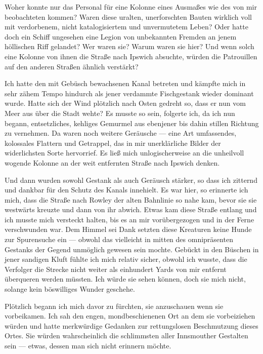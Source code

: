 Woher konnte nur das Personal für eine Kolonne eines Ausmaßes wie des von mir beobachteten kommen? Waren diese uralten, unerforschten Bauten wirklich voll mit verdorbenem, nicht katalogisiertem und unvermutetem Leben? Oder hatte doch ein Schiff ungesehen eine Legion von unbekannten Fremden an jenem höllischen Riff gelandet? Wer waren sie? Warum waren sie hier? Und wenn solch eine Kolonne von ihnen die Straße nach Ipswich absuchte, würden die Patrouillen auf den anderen Straßen ähnlich verstärkt?

Ich hatte den mit Gebüsch bewachsenen Kanal betreten und kämpfte mich in sehr zähem Tempo hindurch als jener verdammte Fischgestank wieder dominant wurde. Hatte sich der Wind plötzlich nach Osten gedreht so, dass er nun vom Meer aus über die Stadt wehte? Es musste so sein, folgerte ich, da ich nun begann, entsetzliches, kehliges Gemurmel aus ebenjener bis dahin stillen Richtung zu vernehmen. Da waren noch weitere Geräusche --- eine Art umfassendes, kolossales Flattern und Getrappel, das in mir unerklärliche Bilder der widerlichsten Sorte hervorrief. Es ließ mich unlogischerweise an die unheilvoll wogende Kolonne an der weit entfernten Straße nach Ipswich denken.

Und dann wurden sowohl Gestank als auch Geräusch stärker, so dass ich zitternd und dankbar für den Schutz des Kanals innehielt. Es war hier, so erinnerte ich mich, dass die Straße nach Rowley der alten Bahnlinie so nahe kam, bevor sie sie westwärts kreuzte und dann von ihr abwich. Etwas kam diese Straße entlang und ich musste mich versteckt halten, bis es an mir vorübergezogen und in der Ferne verschwunden war. Dem Himmel sei Dank setzten diese Kreaturen keine Hunde zur Spurensuche ein --- obwohl das vielleicht in mitten des omnipräsenten Gestanks der Gegend unmöglich gewesen sein mochte. Gebückt in den Büschen in jener sandigen Kluft fühlte ich mich relativ sicher, obwohl ich wusste, dass die Verfolger die Strecke nicht weiter als einhundert Yards von mir entfernt überqueren werden müssten. Ich würde sie sehen können, doch sie mich nicht, solange kein böswilliges Wunder geschehe.

Plötzlich begann ich mich davor zu fürchten, sie anzuschauen wenn sie vorbeikamen. Ich sah den engen, mondbeschienenen Ort an dem sie vorbeiziehen würden und hatte merkwürdige Gedanken zur rettungslosen Beschmutzung dieses Ortes. Sie würden wahrscheinlich die schlimmsten aller Innsmouther Gestalten sein --- etwas, dessen man sich nicht erinnern möchte.

